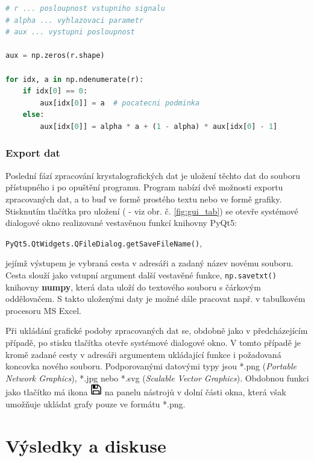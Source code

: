 \documentclass[a4paper, 12pt]{article}
\newcommand*{\Icon}{\includegraphics[width=0.5cm, height=0.5cm]{icon.PNG}}%
\begin{document}
\vskip 0.2in
\begin{lstlisting}[language=Python,numbers=none,frame=single]
# r ... posloupnost vstupniho signalu
# alpha ... vyhlazovaci parametr
# aux ... vystupni posloupnost

aux = np.zeros(r.shape)

for idx, a in np.ndenumerate(r):
    if idx[0] == 0:
        aux[idx[0]] = a  # pocatecni podminka
    else:
        aux[idx[0]] = alpha * a + (1 - alpha) * aux[idx[0] - 1]
\end{lstlisting}
\vskip 0.2in

\subsubsection{Export dat} \label{sec:export}
Poslední fází zpracování krystalografických dat je uložení těchto dat do souboru přístupného i po opuštění programu. Program nabízí dvě možnosti exportu zpracovaných dat, a to buď ve formě prostého textu nebo ve formě grafiky.
Stisknutím tlačítka pro uložení ( - viz obr. č. \ref{fig:gui_tab}) se otevře systémové dialogové okno realizované vestavěnou funkcí knihovny PyQt5:
\begin{center}
 \texttt{PyQt5.QtWidgets.QFileDialog.getSaveFileName()},   
\end{center}
jejímž výstupem je vybraná cesta v adresáři a zadaný název novému souboru. Cesta slouží jako vstupní argument další vestavěné funkce, \texttt{np.savetxt()} knihovny \textbf{numpy}, která data uloží do textového souboru s čárkovým oddělovačem. S takto uloženými daty je možné dále pracovat např. v tabulkovém procesoru MS Excel.

Při ukládání grafické podoby zpracovaných dat se, obdobně jako v předcházejícím případě, po stisku tlačítka  otevře systémové dialogové okno. V tomto případě je kromě zadané cesty v adresáři argumentem ukládající funkce i požadovaná koncovka nového souboru. Podporovanými datovými typy jsou *.png (\textit{Portable Network Graphics}), *.jpg nebo *.svg (\textit{Scalable Vector Graphics}). Obdobnou funkci jako tlačítko  má ikona \hspace{0.09cm}\Icon\hspace{0.09cm} na panelu nástrojů v dolní části okna, která však umožňuje ukládat grafy pouze ve formátu *.png.

\newpage

\section{Výsledky a diskuse} \label{sec:diskuze}
\end{document}
